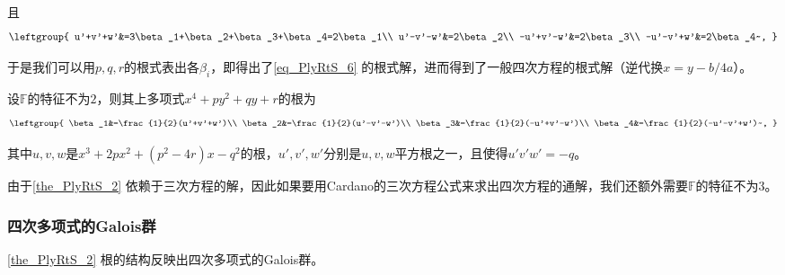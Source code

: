 且
\begin{equation}
\leftgroup{
    u'+v'+w'&=3\beta_1+\beta_2+\beta_3+\beta_4=2\beta_1\\
    u'-v'-w'&=2\beta_2\\
    -u'+v'-w'&=2\beta_3\\
    -u'-v'+w'&=2\beta_4~,
}
\end{equation}

于是我们可以用$p, q, r$的根式表出各$\beta_i$，即得出了\autoref{eq_PlyRtS_6} 的根式解，进而得到了一般四次方程的根式解（逆代换$x=y-b/4a$）。

\begin{theorem}{}\label{the_PlyRtS_2}

设$\mathbb{F}$的特征不为$2$，则其上多项式$x^4+py^2+qy+r$的根为
\begin{equation}
\leftgroup{
    \beta_1&=\frac{1}{2}(u'+v'+w')\\
    \beta_2&=\frac{1}{2}(u'-v'-w')\\
    \beta_3&=\frac{1}{2}(-u'+v'-w')\\
    \beta_4&=\frac{1}{2}(-u'-v'+w')~,
}
\end{equation}

其中$u, v, w$是$x^3+2px^2+(p^2-4r)x-q^2$的根，$u', v', w'$分别是$u, v, w$平方根之一，且使得$u'v'w'=-q$。

\end{theorem}

由于\autoref{the_PlyRtS_2} 依赖于三次方程的解，因此如果要用Cardano的三次方程公式来求出四次方程的通解，我们还额外需要$\mathbb{F}$的特征不为$3$。


\subsubsection{四次多项式的Galois群}


\autoref{the_PlyRtS_2} 根的结构反映出四次多项式的Galois群。

